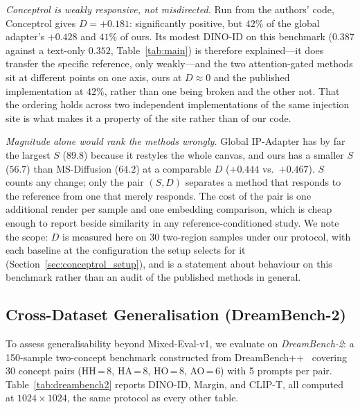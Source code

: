 \documentclass[10pt,twocolumn,letterpaper]{article}
\begin{document}
\noindent\textit{Conceptrol is weakly responsive, not misdirected.}
Run from the authors' code, Conceptrol gives $D=+0.181$: significantly
positive, but $42\%$ of the global adapter's $+0.428$ and $41\%$ of ours.  Its
modest DINO-ID on this benchmark ($0.387$ against a text-only $0.352$,
Table~\ref{tab:main}) is therefore explained---it does transfer the specific
reference, only weakly---and the two attention-gated methods sit at different
points on one axis, ours at $D\!\approx\!0$ and the published implementation
at $42\%$, rather than one being broken and the other not.  That the ordering
holds across two independent implementations of the same injection site is
what makes it a property of the site rather than of our code.

\noindent\textit{Magnitude alone would rank the methods wrongly.}
Global IP-Adapter has by far the largest $S$ ($89.8$) because it restyles the
whole canvas, and ours has a smaller $S$ ($56.7$) than MS-Diffusion ($64.2$)
at a comparable $D$ ($+0.444$ vs.\ $+0.467$).  $S$ counts any change; only the
pair $(S,D)$ separates a method that responds to the reference from one that
merely responds.  The cost of the pair is one additional render per sample and
one embedding comparison, which is cheap enough to report beside similarity in
any reference-conditioned study.  We note the scope: $D$ is measured here on
30 two-region samples under our protocol, with each baseline at the
configuration the setup selects for it (Section~\ref{sec:conceptrol_setup}),
and is a statement about behaviour on this benchmark rather than an audit of
the published methods in general.

\subsection{Cross-Dataset Generalisation (DreamBench-2)}
\label{sec:dreambench2}

To assess generalisability beyond Mixed-Eval-v1, we evaluate on
\emph{DreamBench-2}: a 150-sample two-concept benchmark constructed from
DreamBench++~\cite{peng2025dreambench} covering 30 concept pairs
(HH\,=\,8, HA\,=\,8, HO\,=\,8, AO\,=\,6) with 5 prompts per pair.
Table~\ref{tab:dreambench2} reports DINO-ID, Margin, and CLIP-T, all
computed at $1024\times1024$, the same protocol as every other table.
\end{document}
